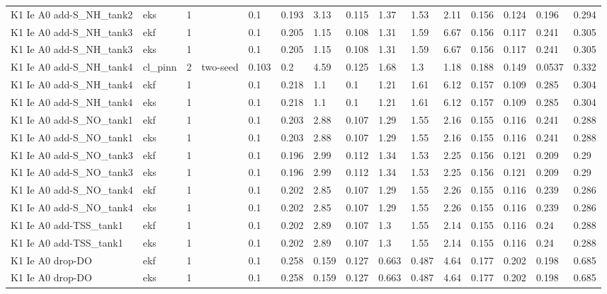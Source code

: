 \begin{table}[t]
\begin{tabular}{lllllllllllllll}
K1 Ie A0 add-S\_NH\_tank2 & eks & 1 &  & 0.1 & 0.193 & 3.13 & 0.115 & 1.37 & 1.53 & 2.11 & 0.156 & 0.124 & 0.196 & 0.294 \\
K1 Ie A0 add-S\_NH\_tank3 & ekf & 1 &  & 0.1 & 0.205 & 1.15 & 0.108 & 1.31 & 1.59 & 6.67 & 0.156 & 0.117 & 0.241 & 0.305 \\
K1 Ie A0 add-S\_NH\_tank3 & eks & 1 &  & 0.1 & 0.205 & 1.15 & 0.108 & 1.31 & 1.59 & 6.67 & 0.156 & 0.117 & 0.241 & 0.305 \\
K1 Ie A0 add-S\_NH\_tank4 & cl\_pinn & 2 & two-seed & 0.103 & 0.2 & 4.59 & 0.125 & 1.68 & 1.3 & 1.18 & 0.188 & 0.149 & 0.0537 & 0.332 \\
K1 Ie A0 add-S\_NH\_tank4 & ekf & 1 &  & 0.1 & 0.218 & 1.1 & 0.1 & 1.21 & 1.61 & 6.12 & 0.157 & 0.109 & 0.285 & 0.304 \\
K1 Ie A0 add-S\_NH\_tank4 & eks & 1 &  & 0.1 & 0.218 & 1.1 & 0.1 & 1.21 & 1.61 & 6.12 & 0.157 & 0.109 & 0.285 & 0.304 \\
K1 Ie A0 add-S\_NO\_tank1 & ekf & 1 &  & 0.1 & 0.203 & 2.88 & 0.107 & 1.29 & 1.55 & 2.16 & 0.155 & 0.116 & 0.241 & 0.288 \\
K1 Ie A0 add-S\_NO\_tank1 & eks & 1 &  & 0.1 & 0.203 & 2.88 & 0.107 & 1.29 & 1.55 & 2.16 & 0.155 & 0.116 & 0.241 & 0.288 \\
K1 Ie A0 add-S\_NO\_tank3 & ekf & 1 &  & 0.1 & 0.196 & 2.99 & 0.112 & 1.34 & 1.53 & 2.25 & 0.156 & 0.121 & 0.209 & 0.29 \\
K1 Ie A0 add-S\_NO\_tank3 & eks & 1 &  & 0.1 & 0.196 & 2.99 & 0.112 & 1.34 & 1.53 & 2.25 & 0.156 & 0.121 & 0.209 & 0.29 \\
K1 Ie A0 add-S\_NO\_tank4 & ekf & 1 &  & 0.1 & 0.202 & 2.85 & 0.107 & 1.29 & 1.55 & 2.26 & 0.155 & 0.116 & 0.239 & 0.286 \\
K1 Ie A0 add-S\_NO\_tank4 & eks & 1 &  & 0.1 & 0.202 & 2.85 & 0.107 & 1.29 & 1.55 & 2.26 & 0.155 & 0.116 & 0.239 & 0.286 \\
K1 Ie A0 add-TSS\_tank1 & ekf & 1 &  & 0.1 & 0.202 & 2.89 & 0.107 & 1.3 & 1.55 & 2.14 & 0.155 & 0.116 & 0.24 & 0.288 \\
K1 Ie A0 add-TSS\_tank1 & eks & 1 &  & 0.1 & 0.202 & 2.89 & 0.107 & 1.3 & 1.55 & 2.14 & 0.155 & 0.116 & 0.24 & 0.288 \\
K1 Ie A0 drop-DO & ekf & 1 &  & 0.1 & 0.258 & 0.159 & 0.127 & 0.663 & 0.487 & 4.64 & 0.177 & 0.202 & 0.198 & 0.685 \\
K1 Ie A0 drop-DO & eks & 1 &  & 0.1 & 0.258 & 0.159 & 0.127 & 0.663 & 0.487 & 4.64 & 0.177 & 0.202 & 0.198 & 0.685 \\

\end{tabular}
\end{table}
